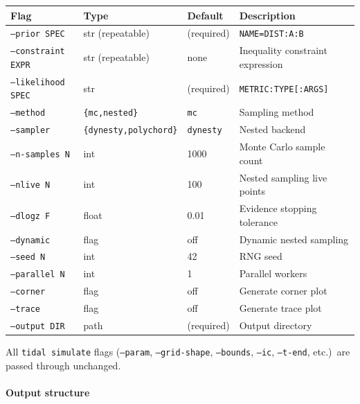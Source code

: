 \begin{table}[htbp]
\centering
\begin{tabular}{@{}llll@{}}
\toprule
Flag & Type & Default & Description \\
\midrule
\texttt{--prior SPEC}       & str (repeatable) & (required) & \texttt{NAME=DIST:A:B} \\
\texttt{--constraint EXPR}  & str (repeatable) & none       & Inequality constraint expression \\
\texttt{--likelihood SPEC}  & str              & (required) & \texttt{METRIC:TYPE[:ARGS]} \\
\texttt{--method}           & \texttt{\{mc,nested\}}        & \texttt{mc}      & Sampling method \\
\texttt{--sampler}          & \texttt{\{dynesty,polychord\}} & \texttt{dynesty} & Nested backend \\
\texttt{--n-samples N}      & int              & 1000       & Monte Carlo sample count \\
\texttt{--nlive N}          & int              & 100        & Nested sampling live points \\
\texttt{--dlogz F}          & float            & 0.01       & Evidence stopping tolerance \\
\texttt{--dynamic}          & flag             & off        & Dynamic nested sampling \\
\texttt{--seed N}           & int              & 42         & RNG seed \\
\texttt{--parallel N}       & int              & 1          & Parallel workers \\
\texttt{--corner}           & flag             & off        & Generate corner plot \\
\texttt{--trace}            & flag             & off        & Generate trace plot \\
\texttt{--output DIR}       & path             & (required) & Output directory \\
\bottomrule
\end{tabular}
\end{table}

All \texttt{tidal simulate} flags (\texttt{--param}, \texttt{--grid-shape},
\texttt{--bounds}, \texttt{--ic}, \texttt{--t-end}, etc.)\ are passed through
unchanged.

\paragraph{Output structure}

